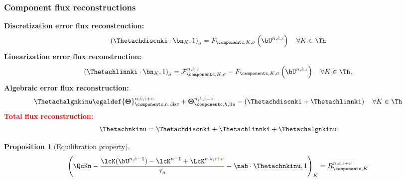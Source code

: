 \documentclass[10 pt]{beamer}
\newtheorem{proposition}[theorem]{Proposition}
\begin{document}
\begin{frame}
\frametitle{Component flux reconstructions}
\textcolor{cadmiumgreen}{\textbf{Discretization error flux reconstruction:}}
\begin{equation*}
\left(\Thetachdiscnki \cdot \bn_K,1 \right)_{\sigma} = F_{\componentc,K,\sigma}\left(\bU^{n,\kk, \ii}\right) \quad \forall K \in \Th
\end{equation*}
\vspace{-0.1 cm}
\textcolor{cadmiumgreen}{\textbf{Linearization error flux reconstruction:}}
\begin{equation*}
\left(\Thetachlinnki \cdot \bn_K,1 \right)_{\sigma} = \mathcal{F}_{\componentc,K,\sigma}^{n,\kk,\ii} -  F_{\componentc,K,\sigma}\left(\bU^{n,\kk, \ii}\right) \quad \forall K \in \Th,
\end{equation*}
\vspace{-0.1 cm}
\textcolor{cadmiumgreen}{\textbf{Algebraic error flux reconstruction:}}
\begin{equation*}
\Thetachalgnkinu  \egaldef {\bm \Theta}_{\componentc,h,\mathrm{disc}}^{n,\kk,\ii+\nuu} + {\bm \Theta}_{\componentc,h,\mathrm{lin}}^{n,\kk,\ii+\nuu} - \left(\Thetachdiscnki + \Thetachlinnki \right)
 \quad \forall K \in \Th
\end{equation*}
\textcolor{red}{\textbf{Total flux reconstruction:}} 
\begin{equation*}
\Thetachnkinu = \Thetachdiscnki+\Thetachlinnki+\Thetachalgnkinu
\end{equation*}
\vspace{-0.2 cm}
\begin{proposition}[Equilibration property]
\begin{equation*}
\left(\QcKn - \frac{\lcK(\bU^{n,\kk-1})-\lcK^{n-1} + \LcK^{n,\kk, \textcolor{burntorange}{i + \nu}}}{\tau_n} - \nab \cdot \Thetachnkinu,1\right)_K=R_{\componentc,K}^{n,\kk,\ii+ \nuu}
\end{equation*}
\end{proposition}
\end{frame}
%
\end{document}
